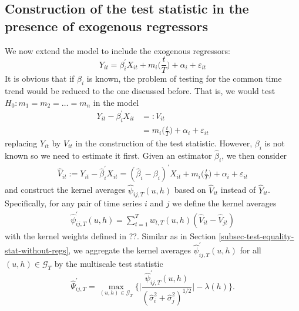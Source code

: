 \documentclass[a4paper,12pt]{article}
\makeatletter
\renewcommand{\eqref}[1]{\tagform@{\ref{#1}}}
\makeatother
\begin{document}
%
%

\subsection{Construction of the test statistic in the presence of exogenous regressors}\label{subsec-test-equality-stat-with-regs}

We now extend the model \eqref{model} to include the exogenous regressors:
\begin{equation}
Y_{it} = \beta_i^\prime X_{it} + m_i \Big( \frac{t}{T} \Big) + \alpha_i + \varepsilon_{it} 
\end{equation}
It is obvious that if $\beta_i$ is known, the problem of testing for the common time trend would be reduced to the one discussed before. That is, we would test $H_0: m_1 = m_2 = \ldots = m_n$ in the model
\begin{align*}
Y_{it} - \beta_i^\prime X_{it} & =: V_{it}\\
					& = m_i \Big( \frac{t}{T} \Big) + \alpha_i + \varepsilon_{it} 
\end{align*}
replacing $Y_{it}$ by $V_{it}$ in the construction of the test statistic. However, $\beta_i$ is not known so we need to estimate it first. Given an estimator $\widehat{\beta}_i$, we then consider
\begin{align*}
	\widehat{V}_{it} := Y_{it} - \widehat{\beta}_i^\prime X_{it} =(\widehat{\beta}_i - \beta_i)^\prime X_{it} + m_i \Big( \frac{t}{T} \Big) + \alpha_i + \varepsilon_{it} 
\end{align*}
and construct the kernel averages $\widehat{\psi}_{ij, T}(u, h)$ based on $\widehat{V}_{it}$ instead of $\widehat{Y}_{it}$. Specifically, for any pair of time series $i$ and $j$ we define the kernel averages
\begin{align*}
	\widehat{\psi}^{\prime}_{ij, T}(u, h) = \sum_{t=1}^T w_{t, T}(u, h)(\widehat{V}_{it} - \widehat{V}_{jt})
\end{align*}
with the kernel weights defined in ??. Similar as in Section \ref{subsec-test-equality-stat-without-regs}, we aggregate the kernel averages $\widehat{\psi}^{\prime}_{ij, T}(u, h)$ for all $(u, h)\in \mathcal{G}_T$ by the multiscale test statistic
\[ \widehat{\Psi}^\prime_{ij,T} = \max_{(u,h) \in \mathcal{G}_T} \Big\{ \Big|\frac{\widehat{\psi}^\prime_{ij,T}(u,h)}{(\widehat{\sigma}_i^2 + \widehat{\sigma}_j^2)^{1/2}}\Big| - \lambda(h) \Big\}. \]
\end{document}
